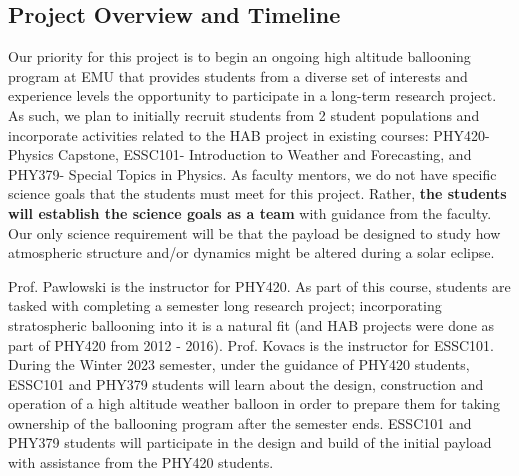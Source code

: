 \documentclass[12pt]{article}
\begin{document}
\subsection{Project Overview and Timeline}
Our priority for this project is to begin an ongoing high altitude ballooning program
at EMU that provides students from a diverse set of interests and experience levels
the opportunity to participate in a long-term research project. As such,
we plan to initially recruit students from 2 student populations and incorporate
activities related to the HAB project in existing courses: PHY420- Physics
Capstone, ESSC101- Introduction to Weather and Forecasting, and PHY379- Special Topics in Physics.
As faculty mentors,
we do not have specific science goals that the students must meet for this project. Rather,
{\bf the students will establish the science goals as a team }with guidance from the faculty.
Our only science requirement will be that the payload be designed to study how
atmospheric structure and/or dynamics might be altered during a solar eclipse.

 
Prof. Pawlowski is the instructor for PHY420. As part of this course, students are tasked with completing
a semester long research project; incorporating stratospheric ballooning into it is a
natural fit (and HAB projects were done as part of PHY420 from 2012 - 2016). Prof. Kovacs is the instructor for ESSC101. During the Winter 2023 semester, under the guidance of PHY420 students,
 ESSC101 and PHY379 students will learn about the design, construction and operation
of a high altitude weather balloon in order to prepare them for taking ownership of the
ballooning program after the semester ends. ESSC101 and PHY379 students will
participate in the design and build of the initial payload with assistance from the PHY420 students.
\end{document}
